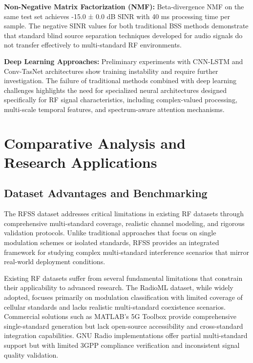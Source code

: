 \documentclass[twocolumn]{article}
\begin{document}
\textbf{Non-Negative Matrix Factorization (NMF):} Beta-divergence NMF on the same test set achieves -15.0 ± 0.0 dB SINR with 40 ms processing time per sample. The negative SINR values for both traditional BSS methods demonstrate that standard blind source separation techniques developed for audio signals do not transfer effectively to multi-standard RF environments.

\textbf{Deep Learning Approaches:} Preliminary experiments with CNN-LSTM and Conv-TasNet architectures show training instability and require further investigation. The failure of traditional methods combined with deep learning challenges highlights the need for specialized neural architectures designed specifically for RF signal characteristics, including complex-valued processing, multi-scale temporal features, and spectrum-aware attention mechanisms.

\section{Comparative Analysis and Research Applications}

\subsection{Dataset Advantages and Benchmarking}

The RFSS dataset addresses critical limitations in existing RF datasets through comprehensive multi-standard coverage, realistic channel modeling, and rigorous validation protocols. Unlike traditional approaches that focus on single modulation schemes or isolated standards, RFSS provides an integrated framework for studying complex multi-standard interference scenarios that mirror real-world deployment conditions.

Existing RF datasets suffer from several fundamental limitations that constrain their applicability to advanced research. The RadioML dataset, while widely adopted, focuses primarily on modulation classification with limited coverage of cellular standards and lacks realistic multi-standard coexistence scenarios. Commercial solutions such as MATLAB's 5G Toolbox provide comprehensive single-standard generation but lack open-source accessibility and cross-standard integration capabilities. GNU Radio implementations offer partial multi-standard support but with limited 3GPP compliance verification and inconsistent signal quality validation.
\end{document}

